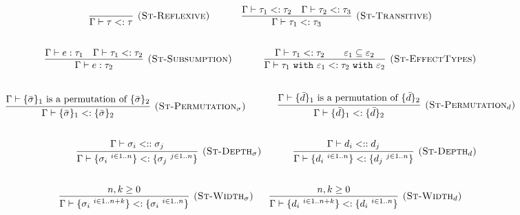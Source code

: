 \documentclass{llncs}
\newcommand{\keywadj}[1]{\mathtt{#1}}
\newcommand{\keyw}[1]{\keywadj{#1}~}
\newcommand{\type}[2]{
	#1~\keyw{with} #2
}
\begin{document}
\[
\begin{array}{c}

\infer[\textsc{(St-Reflexive)}]
	{\Gamma \vdash \tau <: \tau}
	{}
	
~~~~~~~~~~

	\infer[\textsc{(St-Transitive)}]
	{\Gamma \vdash \tau_1 <: \tau_3}
	{\Gamma \vdash \tau_1 <: \tau_2 & \Gamma \vdash \tau_2 <: \tau_3}\\[5ex]

\infer[\textsc{(St-Subsumption)}]
	{\Gamma \vdash e : \tau_2}
	{\Gamma \vdash e : \tau_1 & \Gamma \vdash \tau_1 <: \tau_2} 
	
	~~~~~~~~~~
	
\infer[\textsc{(St-EffectTypes)}]
	{ \Gamma \vdash \type{\tau_1}{\varepsilon_1} <: \type{\tau_2}{\varepsilon_2}}
	{ \Gamma \vdash \tau_1 <: \tau_2 ~~~~~~ \varepsilon_1 \subseteq \varepsilon_2} \\[5ex]

\infer[\textsc{(St-Permutation$_\sigma$)}]
	{\Gamma \vdash \{ \bar \sigma \}_1 <: \{ \bar \sigma \}_2 }
	{\Gamma \vdash \{ \bar \sigma \}_1 $ is a permutation of $ \{ \bar \sigma \}_2}
	
	~~~~~~~~~~
	
\infer[\textsc{(St-Permutation$_d$)}]
	{\Gamma \vdash \{ \bar d \}_1 <: \{ \bar d \}_2 }
	{\Gamma \vdash \{ \bar d \}_1 $ is a permutation of $ \{ \bar d \}_2}
	
	\\[5ex]
	
	~~~~~~~~~~

\infer[\textsc{(St-Depth$_\sigma$)}]
	{ \Gamma \vdash \{ \sigma_i~^{i \in 1..n} \} <: \{ \sigma_j~^{j \in 1..n} \} }
	{ \Gamma \vdash \sigma_i <:: \sigma_j }
	
	~~~~~~~~~~
	
\infer[\textsc{(St-Depth$_d$)}]
	{ \Gamma \vdash \{ d_i~^{i \in 1..n} \} <: \{ d_j~^{j \in 1..n} \} }
	{ \Gamma \vdash d_i <:: d_j }
	
	\\[5ex]
	
\infer[\textsc{(St-Width$_\sigma$)}]
	{ \Gamma \vdash \{ \sigma_i~^{i \in 1..n+k} \} <: \{ \sigma_i~^{i \in 1..n} \} }
	{n,k \geq 0}
	
~~~~~
  
\infer[\textsc{(St-Width$_d$)}]
	{ \Gamma \vdash \{ d_i~^{i \in 1..n+k} \} <: \{ d_i~^{i \in 1..n} \} }
	{n,k \geq 0}
	
		\\[5ex]
	
	
\end{array}
\]
\end{document}
